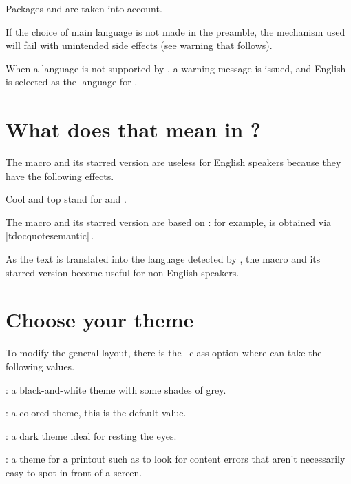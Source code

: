 \begin{tdocnote}
    Packages  and  are taken into account.
\end{tdocnote}


\begin{tdoccaut}
    If the choice of main language is not made in the preamble, the mechanism used will fail with unintended side effects (see warning that follows).
\end{tdoccaut}


\begin{tdocwarn}
    When a language is not supported by \thisproj, a warning message is issued, and English is selected as the language for \thisproj.
\end{tdocwarn}


\section{What does that mean in ?}

The macro  and its starred version are useless for English speakers because they have the following effects.


\begin{tdoclatex}
Cool and top stand for  and .
\end{tdoclatex}


The macro  and its starred version are based on  : for example,  is obtained via \tdoclatexin|tdocquote{semantic}|\,.


\begin{tdocnote}
    As the text  is translated into the language detected by \thisproj, the macro  and its starred version become useful for non-English speakers.
\end{tdocnote}


\section{Choose your theme}

To modify the general layout, there is the \thisproj\ class option  where  can take the following values.

\begin{tasks}[style=itemize]
    \task {}:
          a black-and-white theme with some shades of grey.

    \task {}:
          a colored theme, this is the default value.

    \task {}:
          a dark theme ideal for resting the eyes.

    \task {}:
          a theme for a printout such as to look for content errors that aren't necessarily easy to spot in front of a screen.
\end{tasks}


